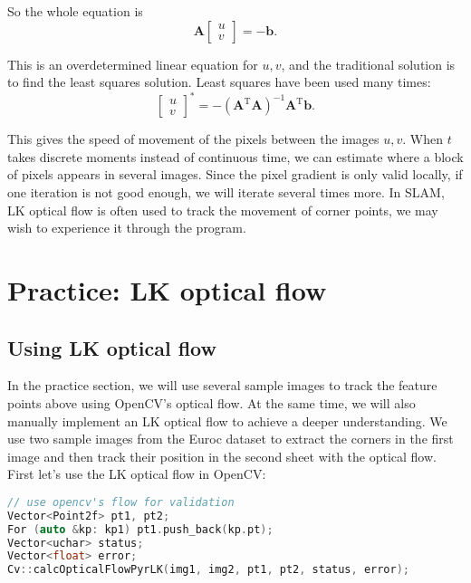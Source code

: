 So the whole equation is
\begin{equation}
\bm{A}\left[ \begin{array}{l}
u\\
v
\end{array} \right] = - \bm{b}.
\end{equation}

This is an overdetermined linear equation for $u,v$, and the traditional solution is to find the least squares solution. Least squares have been used many times:
\begin{equation}
{\left[ \begin{array}{l}
u\\
v
\end{array} \right]^*} = -{\left( {{ \bm{A}^\mathrm{T}}\bm{A}} \right)^{ - 1}}{ \bm{ A}^\mathrm{T}}\bm{b}.
\end{equation}

This gives the speed of movement of the pixels between the images $u, v$. When $t$ takes discrete moments instead of continuous time, we can estimate where a block of pixels appears in several images. Since the pixel gradient is only valid locally, if one iteration is not good enough, we will iterate several times more. In SLAM, LK optical flow is often used to track the movement of corner points, we may wish to experience it through the program.

\section{Practice: LK optical flow}
\label{sec:LKFlow}
\subsection{Using LK optical flow}
In the practice section, we will use several sample images to track the feature points above using OpenCV's optical flow. At the same time, we will also manually implement an LK optical flow to achieve a deeper understanding. We use two sample images from the Euroc dataset to extract the corners in the first image and then track their position in the second sheet with the optical flow. First let's use the LK optical flow in OpenCV:

\begin{lstlisting}[language=c++,caption=slambook2/ch8/optical_flow.cpp(fragment)]
// use opencv's flow for validation
Vector<Point2f> pt1, pt2;
For (auto &kp: kp1) pt1.push_back(kp.pt);
Vector<uchar> status;
Vector<float> error;
Cv::calcOpticalFlowPyrLK(img1, img2, pt1, pt2, status, error);
\end{lstlisting}

